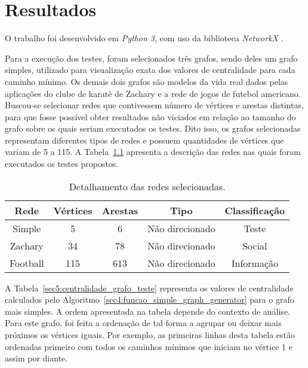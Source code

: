 \graphicspath{{\currfiledir/images/}}

\chapter{Resultados}
O trabalho foi desenvolvido em \emph{Python 3}, com uso da biblioteca \emph{NetworkX} \cite{networkx2021}.

Para a execução dos testes, foram selecionados três grafos, sendo deles um grafo simples, utilizado para visualização exata dos valores de centralidade para cada caminho mínimo. Os demais dois grafos são modelos da vida real dados pelas aplicações do clube de karatê de Zachary e a rede de jogos de futebol americano. Buscou-se selecionar redes que contivessem número de vértices e arestas distintas, para que fosse possível obter resultados não viciados em relação ao tamanho do grafo sobre os quais seriam executados os testes. Dito isso, os grafos selecionadas representam diferentes tipos de redes e possuem quantidades de vértices que variam de 5 a 115. A Tabela~\ref{sec5:tab_grafos_teste} apresenta a descrição das redes nas quais foram executados os testes propostos.

\begin{table}[!htp]
	\centering
	\caption{Detalhamento das redes selecionadas.}
	\label{sec5:tab_grafos_teste}
	\begin{tabular}{|c|c|c|c|c|}
		\hline
		\textbf{Rede} & \textbf{Vértices} & \textbf{Arestas} & \textbf{Tipo}   & \textbf{Classificação} \\ \hline
		Simple        & 5                 & 6                & Não direcionado & Teste                  \\
		Zachary       & 34                & 78               & Não direcionado & Social                 \\
		Football      & 115               & 613              & Não direcionado & Informação             \\ \hline
	\end{tabular}
\end{table}

A Tabela~\ref{sec5:centralidade_grafo_teste} representa os valores de centralidade calculados pelo Algoritmo~\ref{sec4:funcao_simple_graph_generator} para o grafo mais simples. A ordem apresentada na tabela depende do contexto de análise. Para este grafo, foi feita a ordenação de tal forma a agrupar ou deixar mais próximos os vértices iguais. Por exemplo, as primeiras linhas desta tabela estão ordenadas primeiro com todos os caminhos mínimos que iniciam no vértice 1 e assim por diante.

